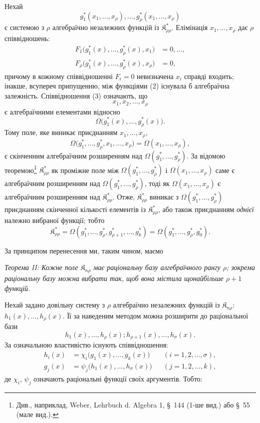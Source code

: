 \documentclass[11pt]{article}
\providecommand{\Kfield}{\mathfrak{K}}
\begin{document}
Нехай
\begin{equation}
  g_1^*(x_1,\ldots,x_\rho),\ldots,
  g_\rho^*(x_1,\ldots,x_\rho)
\tag{2}
\end{equation}
є системою з $\rho$ алгебраїчно незалежних функцій із $\Kfield^*_{\rho\rho}$. Елімінація $x_1,\ldots,x_\rho$ дає $\rho$ співвідношень:
\begin{equation}
\begin{aligned}
  F_1\bigl(g_1^*(x),\ldots,g_\rho^*(x),x_1\bigr)&=0,\ldots,\\
  F_\rho\bigl(g_1^*(x),\ldots,g_\rho^*(x),x_\rho\bigr)&=0,
\end{aligned}
\tag{3}
\end{equation}
причому в кожному співвідношенні $F_i=0$ невизначена $x_i$ справді входить; інакше, всупереч припущенню, між функціями (2) існувала б алгебраїчна залежність. Співвідношення (3) означають, що
\[
  x_1,x_2,\ldots,x_\rho
\]
є алгебраїчними елементами відносно
\[
  \Omega\bigl(g_1^*(x),\ldots,g_\rho^*(x)\bigr).
\]
Тому поле, яке виникає приєднанням $x_1,\ldots,x_\rho$,
\[
  \Omega\bigl(g_1^*,\ldots,g_\rho^*,x_1,
  \ldots,x_\rho\bigr)=\Omega(x_1,\ldots,x_\rho),
\]
є скінченним алгебраїчним розширенням над $\Omega(g_1^*,\ldots,g_\rho^*)$. За відомою теоремою\footnote{Див., наприклад, Weber, Lehrbuch d. Algebra 1, \S\ 144 (1-ше вид.) або \S\ 55 (мале вид.).} $\Kfield^*_{\rho\rho}$ як проміжне поле між $\Omega(g_1^*,\ldots,g_\rho^*)$ і $\Omega(x_1,
\ldots,x_\rho)$ саме є алгебраїчним розширенням над $\Omega(g_1^*,\ldots,g_\rho^*)$, тоді як $\Omega(x_1,
\ldots,x_\rho)$ є алгебраїчним розширенням над $\Kfield^*_{\rho\rho}$. Отже, $\Kfield^*_{\rho\rho}$ виникає з $\Omega(g_1^*,\ldots,g_\rho^*)$ приєднанням скінченної кількості елементів із $\Kfield^*_{\rho\rho}$, або також приєднанням \emph{однієї} належно вибраної функції; тобто
\[
  \Kfield^*_{\rho\rho}
  =\Omega(g_1^*,\ldots,g_\rho^*,g_{\rho+1}^*,\ldots,g_k^*)
  =\Omega(g_1^*,\ldots,g_\rho^*,g_0^*).
\]

За принципом перенесення ми, таким чином, маємо

\emph{Теорема II: Кожне поле $\Kfield_{n\rho}$ має раціональну базу алгебраїчного рангу $\rho$; зокрема раціональну базу можна вибрати так, щоб вона містила щонайбільше $\rho+1$ функцій.}

Нехай задано довільну систему з $\rho$ алгебраїчно незалежних функцій із $\Kfield_{n\rho}$:
$h_1(x),\ldots,h_\rho(x)$. Її за наведеним методом можна розширити до раціональної бази
\[
  h_1(x),\ldots,h_\rho(x);
  h_{\rho+1}(x),\ldots,h_\sigma(x).
\]
За означальною властивістю існують співвідношення:
\[
\begin{aligned}
  h_i(x)&=\chi_i\bigl(g_1(x),\ldots,g_k(x)\bigr)
    &&(i=1,2,\ldots,\sigma),\\
  g_j(x)&=\psi_j\bigl(h_1(x),\ldots,h_\sigma(x)\bigr)
    &&(j=1,2,\ldots,k),
\end{aligned}
\]
де $\chi_i$, $\psi_j$ означають раціональні функції своїх аргументів. Тобто:
\end{document}
